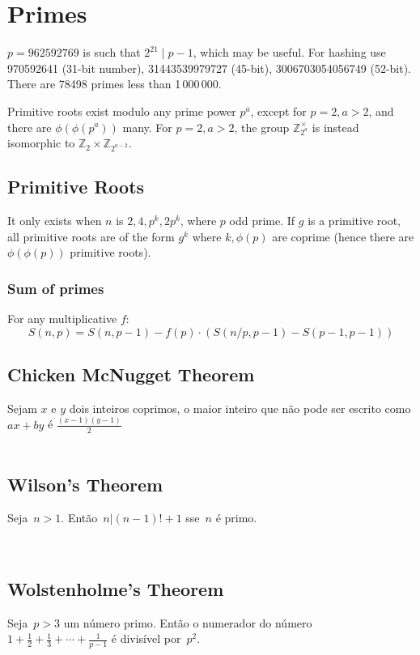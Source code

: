 \section{Primes}
	$p=962592769$ is such that $2^{21} \mid p-1$, which may be useful. For hashing
	use 970592641 (31-bit number), 31443539979727 (45-bit), 3006703054056749
	(52-bit). There are 78498 primes less than 1\,000\,000.

	Primitive roots exist modulo any prime power $p^a$, except for $p = 2, a > 2$, and there are $\phi(\phi(p^a))$ many.
	For $p = 2, a > 2$, the group $\mathbb Z_{2^a}^\times$ is instead isomorphic to $\mathbb Z_2 \times \mathbb Z_{2^{a-2}}$.\\

\subsection{Primitive Roots}
	It only exists when $n$ is $2, 4, p^k, 2p^k$, where $p$ odd prime.
	If $g$ is a primitive root, all primitive roots are of the form $g^k$
	where $k,\phi(p)$ are coprime (hence there are $\phi(\phi(p))$ primitive roots).\\
	
\subsubsection{Sum of primes} For any multiplicative $f$:
                \[
                    S(n,p) = S(n, p-1) - f(p) \cdot (S(n/p,p-1) - S(p-1,p-1))
                \]

\subsection{Chicken McNugget Theorem}
	Sejam $x$ e $y$ dois inteiros coprimos, o maior inteiro que não pode ser escrito como $ax + by$ é $\frac{(x-1)(y-1)}{2}$\\


\


\subsection{Wilson's Theorem}
Seja~$n > 1$. Então~$n|(n-1)!+1$ sse~$n$ é primo. 


\


\subsection{Wolstenholme's Theorem}
Seja~$p > 3$ um número primo. Então o numerador do número 
$ 1 + \frac{1}{2}+\frac{1}{3}+\cdots+\frac{1}{p-1} $
é divisível por~$p^2$.


